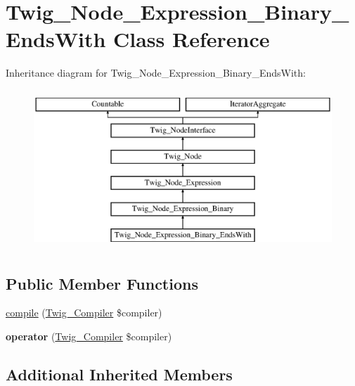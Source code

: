 \hypertarget{classTwig__Node__Expression__Binary__EndsWith}{}\section{Twig\+\_\+\+Node\+\_\+\+Expression\+\_\+\+Binary\+\_\+\+Ends\+With Class Reference}
\label{classTwig__Node__Expression__Binary__EndsWith}
Inheritance diagram for Twig\+\_\+\+Node\+\_\+\+Expression\+\_\+\+Binary\+\_\+\+Ends\+With\+:\begin{figure}[H]
\begin{center}
\leavevmode
\includegraphics[height=6.000000cm]{classTwig__Node__Expression__Binary__EndsWith}
\end{center}
\end{figure}
\subsection*{Public Member Functions}
\begin{DoxyCompactItemize}
\item 
\hyperlink{classTwig__Node__Expression__Binary__EndsWith_a93d26c9497ef8e48964ca77db526b418}{compile} (\hyperlink{classTwig__Compiler}{Twig\+\_\+\+Compiler} \$compiler)
\item 
{\bfseries operator} (\hyperlink{classTwig__Compiler}{Twig\+\_\+\+Compiler} \$compiler)\hypertarget{classTwig__Node__Expression__Binary__EndsWith_a2b8148b18364904e6667b3a0197dd840}{}\label{classTwig__Node__Expression__Binary__EndsWith_a2b8148b18364904e6667b3a0197dd840}

\end{DoxyCompactItemize}
\subsection*{Additional Inherited Members}


